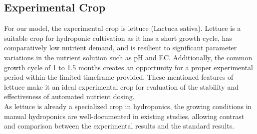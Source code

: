 \subsection{Experimental Crop}
For our model, the experimental crop is lettuce (Lactuca sativa). Lettuce is a suitable crop for hydroponic cultivation as it has a short growth cycle, has comparatively low nutrient demand, and is resilient to significant parameter variations in the nutrient solution such as pH and EC. Additionally, the common growth cycle of 1 to 1.5 months creates an opportunity for  a proper experimental period within the limited timeframe provided. These mentioned features of lettuce make it an ideal experimental crop for evaluation of the stability and effectiveness of automated nutrient dosing.\\[10pt]
As lettuce is already a specialized crop in hydroponics, the growing conditions in manual hydroponics are well-documented in existing studies, allowing contrast and comparison between the experimental results and the standard results.


